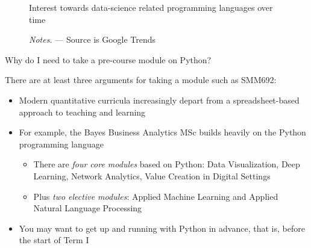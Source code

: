 \documentclass[a4paper,11pt]{book}
\newcommand{\question}[1]{%
    \begin{tcolorbox}[colback=comp_c!10,colframe=comp_c,sidebyside align=top,width=\linewidth,before skip=1ex]
        #1
    \end{tcolorbox}
    \switchcolumn%
}
\newcommand{\note}[1]{%
    \begin{tcolorbox}[colback=white!0,colframe=white!10,width=\linewidth,before skip=1ex]
        #1
    \end{tcolorbox}
}
\begin{document}
\begin{figure}[!htbp]
	\centering
	\sffamily
        \caption{Interest towards data-science related programming languages over time}
        \vspace{-1em}
        \caption*{\textit{Notes.} --- Source is Google Trends}
        \label{fig:python_pop}
\end{figure}

\begin{paracol}{2}
	\question{\raggedright Why do I need to take a pre-course module on Python?}
        \note{
	There are at least three arguments for taking a module such as SMM692:
	\begin{itemize}
		\item Modern quantitative curricula increasingly depart from a spreadsheet-based approach to teaching and learning
		\item For example, the Bayes Business Analytics MSc builds heavily on the Python programming language
		\begin{itemize}
			\item There are \emph{four core modules} based on Python: Data Visualization, Deep Learning, Network Analytics, Value Creation in Digital Settings
			\item Plus \emph{two elective modules}: Applied Machine Learning and Applied Natural Language Processing
		\end{itemize}
		\item You may want to get up and running with Python in advance, that is, before the start of Term I
	\end{itemize}
	}
\end{paracol}
\end{document}
